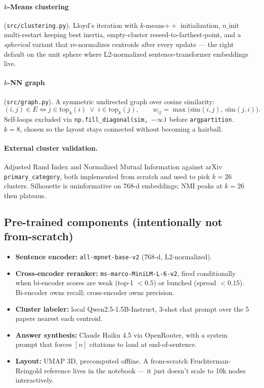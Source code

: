 \documentclass[11pt]{article}
\begin{document}
\paragraph{$k$-Means clustering} (\texttt{src/clustering.py}).
Lloyd's iteration with $k$-means$++$ initialization, $n\_\text{init}$ multi-restart keeping
best inertia, empty-cluster reseed-to-farthest-point, and a \emph{spherical} variant that
re-normalizes centroids after every update --- the right default on the unit sphere where
L2-normalized sentence-transformer embeddings live.

\paragraph{$k$-NN graph} (\texttt{src/graph.py}).
A symmetric undirected graph over cosine similarity:
\[
(i, j) \in E \iff j \in \mathrm{top}_k(i) \;\lor\; i \in \mathrm{top}_k(j),
\qquad
w_{ij} = \max\bigl(\mathrm{sim}(i,j),\ \mathrm{sim}(j,i)\bigr).
\]
Self-loops excluded via \texttt{np.fill\_diagonal(sim, $-\infty$)} before \texttt{argpartition}.
$k = 8$, chosen so the layout stays connected without becoming a hairball.

\paragraph{External cluster validation.}
Adjusted Rand Index and Normalized Mutual Information against arXiv \texttt{primary\_category},
both implemented from scratch and used to pick $k = 26$ clusters. Silhouette is uninformative
on 768-d embeddings; NMI peaks at $k=26$ then plateaus.

\subsection*{Pre-trained components (intentionally not from-scratch)}

\begin{itemize}[noitemsep]
    \item \textbf{Sentence encoder:} \texttt{all-mpnet-base-v2} (768-d, L2-normalized).
    \item \textbf{Cross-encoder reranker:} \texttt{ms-marco-MiniLM-L-6-v2}, fired conditionally
          when bi-encoder scores are weak (top-1 $< 0.5$) or bunched (spread $< 0.15$).
          Bi-encoder owns recall; cross-encoder owns precision.
    \item \textbf{Cluster labeler:} local Qwen2.5-1.5B-Instruct, 3-shot chat prompt over
          the 5 papers nearest each centroid.
    \item \textbf{Answer synthesis:} Claude Haiku 4.5 via OpenRouter, with a system prompt
          that forces $[n]$ citations to land at end-of-sentence.
    \item \textbf{Layout:} UMAP 3D, precomputed offline. A from-scratch Fruchterman-Reingold
          reference lives in the notebook --- it just doesn't scale to 10k nodes interactively.
\end{itemize}
\end{document}
